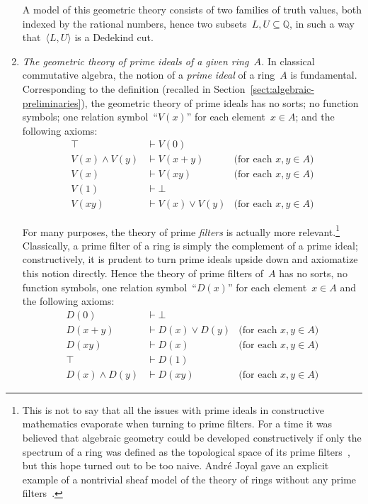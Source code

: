 \documentclass{ws-rv9x6}
\newcommand{\QQ}{\mathbb{Q}}
\renewcommand{\_}{\mathpunct{.}}
\newcommand{\?}{\,{:}\,}
\begin{document}
\begin{enumerate}
A model of this geometric theory consists of two families of truth values, both
indexed by the rational numbers, hence two subsets~$L,U \subseteq \QQ$, in such
a way that~$\langle L,U \rangle$ is a Dedekind cut.

\item \emph{The geometric theory of prime ideals of a given ring~$A$.} In classical
commutative algebra, the notion of a \emph{prime ideal} of a ring~$A$ is
fundamental. Corresponding to the definition (recalled in
Section~\ref{sect:algebraic-preliminaries}), the geometric theory of prime
ideals has no sorts; no function
symbols; one relation symbol~``$V(x)$'' for each element~$x \in A$; and the
following axioms:
\begin{align*}
  \top &\vdash V(0) \\
  V(x) \wedge V(y) &\vdash V(x+y) & \text{(for each~$x,y \in A$)} \\
  V(x) &\vdash V(xy) & \text{(for each~$x,y \in A$)} \\
  V(1) &\vdash \bot \\
  V(xy) &\vdash V(x) \vee V(y) & \text{(for each~$x,y \in A$)}
\end{align*}

For many purposes, the theory of prime \emph{filters} is actually more
relevant.\footnote{This is not to say that all the issues with prime ideals in
constructive mathematics evaporate when turning to prime filters. For a time it
was believed that algebraic geometry could be developed constructively if only
the spectrum of a ring was defined as the topological space of its prime
filters~\cite[Section~3]{lawvere:icm-address}, but this hope turned out to be
too naive. André Joyal gave an explicit example of a nontrivial sheaf model of
the theory of rings without any prime filters~\cite[pp.~200f.]{tierney:spectrum}.}
Classically, a prime filter of a ring is simply the complement of a
prime ideal; constructively, it is prudent to turn prime ideals upside down and axiomatize this notion directly.
Hence the theory of prime filters of~$A$ has no sorts, no function symbols, one
relation symbol~``$D(x)$'' for each element~$x \in A$ and the following
axioms:
\begin{align*}
  D(0) &\vdash \bot \\
  D(x+y) &\vdash D(x) \vee D(y) & \text{(for each~$x,y \in A$)} \\
  D(xy) &\vdash D(x) & \text{(for each~$x,y \in A$)} \\
  \top &\vdash D(1) \\
  D(x) \wedge D(y) &\vdash D(xy) & \text{(for each~$x,y \in A$)}
\end{align*}


\end{enumerate}
\end{document}

